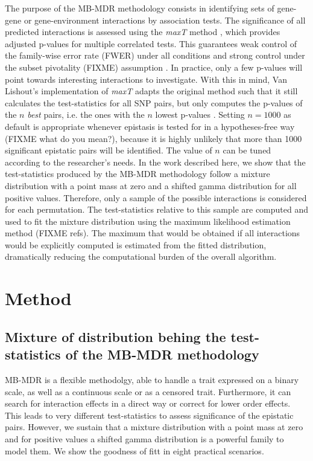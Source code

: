 \documentclass{bmcart}
\begin{document}
The purpose of the MB-MDR methodology consists in identifying sets of gene-gene or gene-environment interactions by association tests. The significance of all predicted interactions is assessed using the {\em maxT} method \cite{Westfall1993}, which provides adjusted p-values for multiple correlated tests. This guarantees weak control of the family-wise error rate (FWER) under all conditions and strong control under the subset pivotality (FIXME) assumption \cite{Ge2003}. In practice, only a few p-values will point towards interesting interactions to investigate. With this in mind, Van Lishout's implementation of {\em maxT} adapts the original method such that it still calculates the test-statistics for all SNP pairs, but only computes the p-values of the $n$ \emph{best} pairs, i.e. the ones with the $n$ lowest p-values \cite{VanLishout2013}. Setting $n = 1000$ as default is appropriate whenever epistasis is tested for in a hypotheses-free way (FIXME what do you mean?), because it is highly unlikely that more than 1000 significant epistatic pairs will be identified. The value of $n$ can be tuned according to the researcher's needs. 
In the work described here, we show that the test-statistics produced by the MB-MDR methodology follow a mixture distribution with a point mass at zero and a shifted gamma distribution for all positive values. Therefore, only a sample of the possible interactions is considered for each permutation. The test-statistics relative to this sample are computed and used to fit the mixture distribution using the maximum likelihood estimation method (FIXME refs). The maximum that would be obtained if all interactions would be explicitly computed is estimated from the fitted distribution, dramatically reducing the computational burden of the overall algorithm.

\section*{Method}
\subsection*{Mixture of distribution behing the test-statistics of the MB-MDR methodology}
MB-MDR is a flexible methodolgy, able to handle a trait expressed on a binary scale, as well as a continuous scale or as a censored trait. Furthermore, it can search for interaction effects in a direct way or correct for lower order effects. This leads to very different test-statistics to assess significance of the epistatic pairs. However, we sustain that a mixture distribution with a point mass at zero and for positive values a shifted gamma distribution is a powerful family to model them. We show the goodness of fitt in eight practical scenarios.
\end{document}

